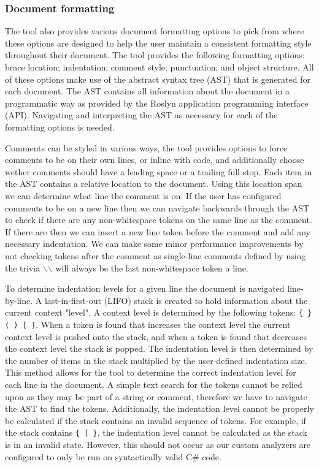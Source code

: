 \subsubsection{Document formatting}
The tool also provides various document formatting options to pick from where these options are designed to help the user maintain a consistent formatting style throughout their document. The tool provides the following formatting options: brace location; indentation; comment style; punctuation; and object structure. All of these options make use of the abstract syntax tree (AST) that is generated for each document. The AST contains all information about the document in a programmatic way as provided by the Roslyn application programming interface (API). Navigating and interpreting the AST as necessary for each of the formatting options is needed.

Comments can be styled in various ways, the tool provides options to force comments to be on their own lines, or inline with code, and additionally choose wether comments should have a leading space or a trailing full stop. Each item in the AST contains a relative location to the document. Using this location span we can determine what line the comment is on. If the user has configured comments to be on a new line then we can navigate backwards through the AST to check if there are any non-whitespace tokens on the same line as the comment. If there are then we can insert a new line token before the comment and add any necessary indentation. We can make some minor performance improvements by not checking tokens after the comment as single-line comments defined by using the trivia \texttt{$\backslash$$\backslash$} will always be the last non-whitespace token a line.

To determine indentation levels for a given line the document is navigated line-by-line. A last-in-first-out (LIFO) stack is created to hold information about the current context "level". A context level is determined by the following tokens: \texttt{\{ \} ( ) [ ]}. When a token is found that increases the context level the current context level is pushed onto the stack, and when a token is found that decreases the context level the stack is popped. The indentation level is then determined by the number of items in the stack multiplied by the user-defined indentation size. This method allows for the tool to determine the correct indentation level for each line in the document.
A simple text search for the tokens cannot be relied upon as they may be part of a string or comment, therefore we have to navigate the AST to find the tokens. Additionally, the indentation level cannot be properly be calculated if the stack contains an invalid sequence of tokens. For example, if the stack contains \texttt{\{ [ \}}, the indentation level cannot be calculated as the stack is in an invalid state. However, this should not occur as our custom analyzers are configured to only be run on syntactically valid C\# code.

